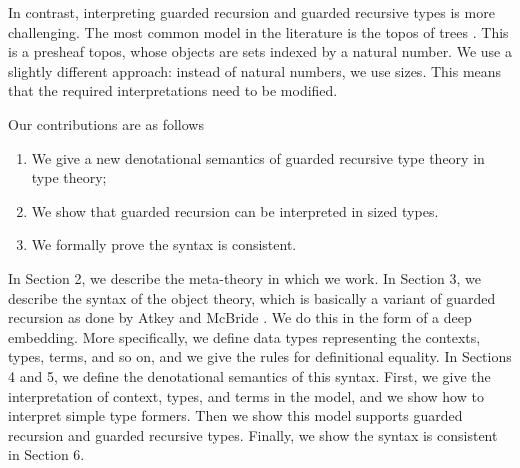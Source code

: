 

In contrast, interpreting guarded recursion and guarded recursive types is more challenging.
The most common model in the literature is the topos of trees \cite{BMSS-synthetic}.
This is a presheaf topos, whose objects are sets indexed by a natural number.
We use a slightly different approach: instead of natural numbers, we use sizes.
This means that the required interpretations need to be modified.

Our contributions are as follows
\begin{enumerate}
	\item We give a new denotational semantics of guarded recursive type theory in type theory;
	\item We show that guarded recursion can be interpreted in sized types.
	\item We formally prove the syntax is consistent.
\end{enumerate}

In Section 2, we describe the meta-theory in which we work.
In Section 3, we describe the syntax of the object theory, which is basically a variant of guarded recursion as done by Atkey and McBride \cite{atkey2013productive}.
We do this in the form of a deep embedding.
More specifically, we define data types representing the contexts, types, terms, and so on, and we give the rules for definitional equality.
In Sections 4 and 5, we define the denotational semantics of this syntax.
First, we give the interpretation of context, types, and terms in the model, and we show how to interpret simple type formers.
Then we show this model supports guarded recursion and guarded recursive types.
Finally, we show the syntax is consistent in Section 6.

